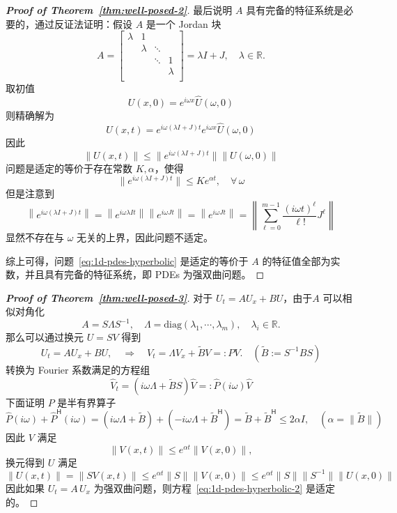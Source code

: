 \begin{proof}[\normalfont\bfseries Proof of Theorem~\ref{thm:well-posed-2}]
    最后说明 $A$ 具有完备的特征系统是必要的，通过反证法证明：假设 $A$ 是一个 Jordan 块
    \[
        A = \begin{bmatrix}
            \lambda & 1       &        &         \\
                    & \lambda & \ddots &         \\
                    &         & \ddots & 1       \\
                    &         &        & \lambda \\
        \end{bmatrix}
        = \lambda I + J,\quad \lambda \in \mathbb{R}.
    \]
    取初值
    \[
        U(x,0) = e^{i \omega x} \widehat{U}(\omega,0)
    \]
    则精确解为
    \[
        U(x,t) =  e^{i \omega (\lambda I + J) t} e^{i \omega x} \widehat{U}(\omega,0)
    \]
    因此
    \[
        \|U(x,t)\| \le \|e^{i \omega (\lambda I + J) t}\| \|U(\omega,0)\|
    \]
    问题是适定的等价于存在常数 $K,\alpha$，使得
    \[
        \|e^{i \omega (\lambda I + J) t}\| \le K e^{\alpha t},\quad \forall\,\omega
    \]
    但是注意到
    \[
        \left\| e^{i \omega (\lambda I + J) t} \right\|
        = \left\| e^{i \omega \lambda I t} \right\| \left\| e^{i \omega J t} \right\|
        = \left\| e^{i \omega J t} \right\|
        = \left\|
        \sum_{\ell=0}^{m-1} \frac{(i \omega t)^{\ell}}{\ell!} J^{\ell}
        \right\|
    \]
    显然不存在与 $\omega$ 无关的上界，因此问题不适定。

    综上可得，问题~\eqref{eq:1d-pdes-hyperbolic} 是适定的等价于 $A$ 的特征值全部为实数，并且具有完备的特征系统，即 PDEs 为强双曲问题。
\end{proof}

\begin{proof}[\normalfont\bfseries Proof of Theorem~\ref{thm:well-posed-3}]
    对于 $U_t = A U_x + B U$，由于$A$ 可以相似对角化
    \[
        A = S \Lambda S^{-1},\quad \Lambda = \text{diag}(\lambda_1, \cdots, \lambda_m),\quad \lambda_i \in \mathbb{R}.
    \]
    那么可以通过换元 $U = S V$ 得到
    \[
        U_t = A U_x + B U, \quad \Rightarrow \quad V_t = \Lambda V_x + \widetilde{B} V =: P V.\quad (\widetilde{B} := S^{-1} B S)
    \]
    转换为 Fourier 系数满足的方程组
    \[
        \widehat{V}_t = (i \omega \Lambda + \widetilde{B} S) \widehat{V} =: \widehat{P}(i \omega) \widehat{V}
    \]
    下面证明 $P$ 是半有界算子
    \[
        \widehat{P}(i \omega) + \widehat{P}^\mathsf{H}(i \omega)
        = (i \omega \Lambda + \widetilde{B}) + (- i \omega \Lambda + \widetilde{B}^\mathsf{H})
        = \widetilde{B} + \widetilde{B}^\mathsf{H}
        \le 2 \alpha I,\quad (\alpha = \|\widetilde{B}\|)
    \]
    因此 $V$ 满足
    \[
        \| V(x,t) \| \le e^{\alpha t} \| V(x,0) \|,
    \]
    换元得到 $U$ 满足
    \[
        \| U(x,t) \| = \| S V(x,t) \| \le e^{\alpha t}  \| S \| \| V(x,0) \|
        \le e^{\alpha t}  \| S \| \| S^{-1} \| \| U(x,0) \|
    \]
    因此如果 $U_t = A\,U_x$ 为强双曲问题，则方程~\eqref{eq:1d-pdes-hyperbolic-2} 是适定的。
\end{proof}

